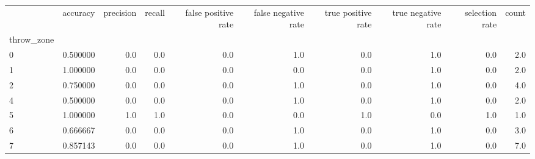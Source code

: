 \begin{tabular}{lrrrrrrrrr}
\toprule
{} &  accuracy &  precision &  recall &  false positive rate &  false negative rate &  true positive rate &  true negative rate &  selection rate &  count \\
throw\_zone &           &            &         &                      &                      &                     &                     &                 &        \\
\midrule
0          &  0.500000 &        0.0 &     0.0 &                  0.0 &                  1.0 &                 0.0 &                 1.0 &             0.0 &    2.0 \\
1          &  1.000000 &        0.0 &     0.0 &                  0.0 &                  0.0 &                 0.0 &                 1.0 &             0.0 &    2.0 \\
2          &  0.750000 &        0.0 &     0.0 &                  0.0 &                  1.0 &                 0.0 &                 1.0 &             0.0 &    4.0 \\
4          &  0.500000 &        0.0 &     0.0 &                  0.0 &                  1.0 &                 0.0 &                 1.0 &             0.0 &    2.0 \\
5          &  1.000000 &        1.0 &     1.0 &                  0.0 &                  0.0 &                 1.0 &                 0.0 &             1.0 &    1.0 \\
6          &  0.666667 &        0.0 &     0.0 &                  0.0 &                  1.0 &                 0.0 &                 1.0 &             0.0 &    3.0 \\
7          &  0.857143 &        0.0 &     0.0 &                  0.0 &                  1.0 &                 0.0 &                 1.0 &             0.0 &    7.0 \\
\bottomrule
\end{tabular}
